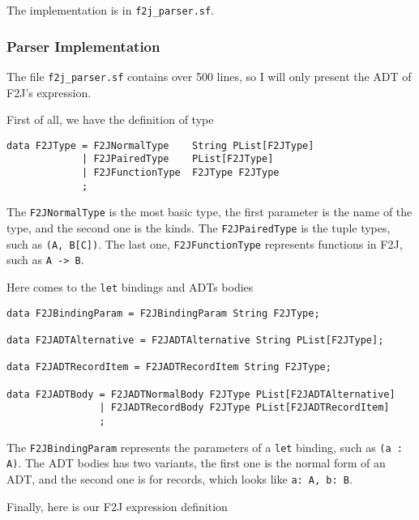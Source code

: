 The implementation is in \texttt{f2j\_parser.sf}.

\subsubsection{Parser Implementation}

The file \texttt{f2j\_parser.sf} contains over 500 lines, so I will only present the ADT of F2J's expression.

First of all, we have the definition of type

\begin{lstlisting}
data F2JType = F2JNormalType    String PList[F2JType]
             | F2JPairedType    PList[F2JType]
             | F2JFunctionType  F2JType F2JType
             ;
\end{lstlisting}

The \texttt{F2JNormalType} is the most basic type, the first parameter is the name of the type, and the second one is the kinds. The \texttt{F2JPairedType} is the tuple types, such as \texttt{(A, B[C])}. The last one, \texttt{F2JFunctionType} represents functions in F2J, such as \texttt{A -> B}.

Here comes to the \texttt{let} bindings and ADTs bodies

\begin{lstlisting}
data F2JBindingParam = F2JBindingParam String F2JType;

data F2JADTAlternative = F2JADTAlternative String PList[F2JType];

data F2JADTRecordItem = F2JADTRecordItem String F2JType;

data F2JADTBody = F2JADTNormalBody F2JType PList[F2JADTAlternative]
                | F2JADTRecordBody F2JType PList[F2JADTRecordItem]
                ;
\end{lstlisting}

The \texttt{F2JBindingParam} represents the parameters of a \texttt{let} binding, such as \texttt{(a : A)}. The ADT bodies has two variants, the first one is the normal form of an ADT, and the second one is for records, which looks like \texttt{{a: A, b: B}}.

Finally, here is our F2J expression definition

